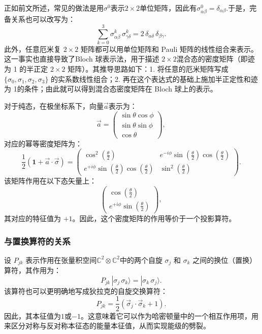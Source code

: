正如前文所述，常见的做法是用$\sigma^0$表示$2 \times 2$单位矩阵，因此有$\sigma^0_{\alpha\beta} = \delta_{\alpha\beta}$.于是，完备关系也可以改写为：
$$
\sum_{k=0}^{3} \sigma^k_{\alpha\beta} \, \sigma^k_{\gamma\delta} = 2\, \delta_{\alpha\delta}\, \delta_{\beta\gamma}.~
$$
此外，任意厄米复 $2 \times 2$ 矩阵都可以用单位矩阵和 Pauli 矩阵的线性组合来表示。这一事实也直接导致了Bloch 球表示法，用于描述 $2 \times 2$混合态的密度矩阵（即迹为 1 的半正定 $2 \times 2$ 矩阵）。其推导思路如下：1. 将任意的厄米矩阵写成 $\{\sigma_0, \sigma_1, \sigma_2, \sigma_3\}$ 的实系数线性组合；2. 再在这个表达式的基础上施加半正定性和迹为 1的条件；由此就可以得到混合态密度矩阵在 Bloch 球上的表示。

对于纯态，在极坐标系下，向量$\vec{a}$表示为：
$$
\vec{a} =
\begin{pmatrix}
\sin\theta \cos\phi \\
\sin\theta \sin\phi \\
\cos\theta
\end{pmatrix},~
$$
对应的幂等密度矩阵为：
$$
\frac{1}{2} \left(\mathbf{1} + \vec{a} \cdot \vec{\sigma}\right)
=
\begin{pmatrix}
\cos^2\left(\frac{\theta}{2}\right) & e^{-i\phi}\sin\left(\frac{\theta}{2}\right)\cos\left(\frac{\theta}{2}\right) \\
e^{+i\phi}\sin\left(\frac{\theta}{2}\right)\cos\left(\frac{\theta}{2}\right) & \sin^2\left(\frac{\theta}{2}\right)
\end{pmatrix}.~
$$
该矩阵作用在以下态矢量上：
$$
\begin{pmatrix}
\cos\left(\frac{\theta}{2}\right) \\
e^{+i\phi}\sin\left(\frac{\theta}{2}\right)
\end{pmatrix},~
$$
其对应的特征值为 $+1$。因此，这个密度矩阵的作用等价于一个投影算符。
\subsubsection{与置换算符的关系}
设 $P_{jk}$ 表示作用在张量积空间$\mathbb{C}^2 \otimes \mathbb{C}^2$中的两个自旋 $\sigma_j$ 和 $\sigma_k$ 之间的换位（置换）算符，其作用为：
$$
P_{jk} \, |\sigma_j \, \sigma_k \rangle = |\sigma_k \, \sigma_j \rangle.~
$$
该算符也可以更明确地写成狄拉克的自旋交换算符：
$$
P_{jk} = \frac{1}{2} \left( \vec{\sigma}_j \cdot \vec{\sigma}_k + 1 \right).~
$$
因此，其本征值为$1$或$-1$。这意味着它可以作为哈密顿量中的一个相互作用项，用来区分对称与反对称本征态的能量本征值，从而实现能级的劈裂。
